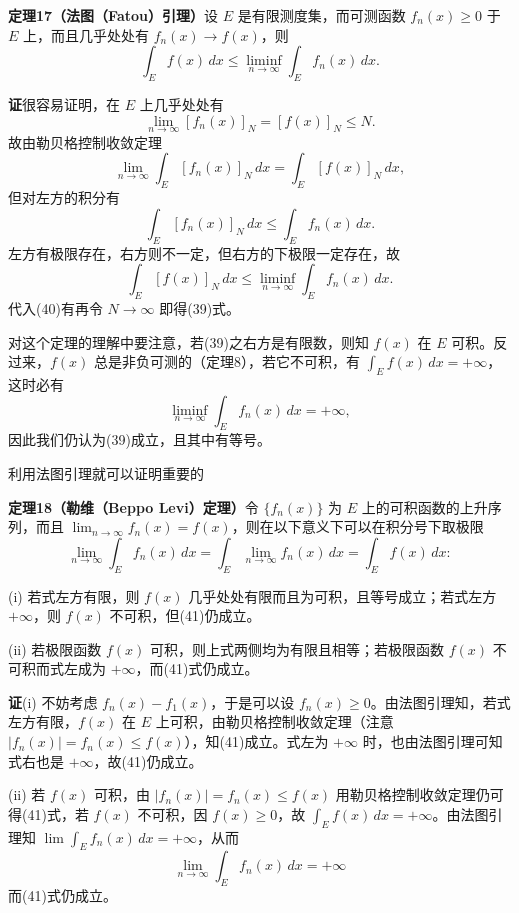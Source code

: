 \noindent\textbf{定理17（法图（Fatou）引理）}\quad 设 $E$ 是有限测度集，而可测函数 $f_n(x)\ge0$ 于 $E$ 上，而且几乎处处有 $f_n(x)\to f(x)$，则
\begin{equation}
 \int_E f(x)\,dx\le\liminf_{n\to\infty}\int_E f_n(x)\,dx.
 \tag{39}
\end{equation}

\noindent\textbf{证}\quad 很容易证明，在 $E$ 上几乎处处有
\[
 \lim_{n\to\infty}[f_n(x)]_N=[f(x)]_N\le N.
\]
故由勒贝格控制收敛定理
\begin{equation}
 \lim_{n\to\infty}\int_E[f_n(x)]_N\,dx=\int_E[f(x)]_N\,dx,
 \tag{40}
\end{equation}
但对左方的积分有
\[
 \int_E[f_n(x)]_N\,dx\le\int_Ef_n(x)\,dx.
\]
左方有极限存在，右方则不一定，但右方的下极限一定存在，故
\[
 \int_E[f(x)]_N\,dx\le\liminf_{n\to\infty}\int_Ef_n(x)\,dx.
\]
代入(40)有再令 $N\to\infty$ 即得(39)式。

对这个定理的理解中要注意，若(39)之右方是有限数，则知 $f(x)$ 在 $E$ 可积。反过来，$f(x)$ 总是非负可测的（定理8），若它不可积，有 $\int_Ef(x)\,dx=+\infty$，这时必有
\[
 \liminf_{n\to\infty}\int_Ef_n(x)\,dx=+\infty,
\]
因此我们仍认为(39)成立，且其中有等号。

利用法图引理就可以证明重要的

\noindent\textbf{定理18（勒维（Beppo Levi）定理）}\quad 令 $\{f_n(x)\}$ 为 $E$ 上的可积函数的上升序列，而且 $\lim_{n\to\infty}f_n(x)=f(x)$，则在以下意义下可以在积分号下取极限
\begin{equation}
 \lim_{n\to\infty}\int_Ef_n(x)\,dx
 =\int_E\lim_{n\to\infty}f_n(x)\,dx
 =\int_Ef(x)\,dx:
 \tag{41}
\end{equation}

(i) 若式左方有限，则 $f(x)$ 几乎处处有限而且为可积，且等号成立；若式左方 $+\infty$，则 $f(x)$ 不可积，但(41)仍成立。

(ii) 若极限函数 $f(x)$ 可积，则上式两侧均为有限且相等；若极限函数 $f(x)$ 不可积而式左成为 $+\infty$，而(41)式仍成立。

\noindent\textbf{证}\quad (i) 不妨考虑 $f_n(x)-f_1(x)$，于是可以设 $f_n(x)\ge0$。由法图引理知，若式左方有限，$f(x)$ 在 $E$ 上可积，由勒贝格控制收敛定理（注意 $|f_n(x)|=f_n(x)\le f(x)$），知(41)成立。式左为 $+\infty$ 时，也由法图引理可知式右也是 $+\infty$，故(41)仍成立。

(ii) 若 $f(x)$ 可积，由 $|f_n(x)|=f_n(x)\le f(x)$ 用勒贝格控制收敛定理仍可得(41)式，若 $f(x)$ 不可积，因 $f(x)\ge0$，故 $\int_Ef(x)\,dx=+\infty$。由法图引理知 $\lim\int_Ef_n(x)\,dx=+\infty$，从而
\[
 \lim_{n\to\infty}\int_Ef_n(x)\,dx=+\infty
\]
而(41)式仍成立。

